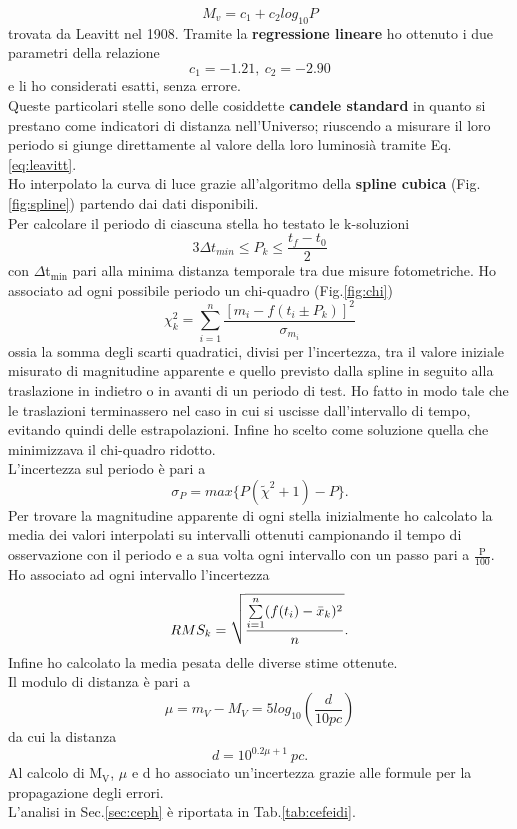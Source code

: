 \documentclass{article}
\numberwithin{equation}{subsection}
\begin{document}
\begin{equation} \label{eq:leavitt}
    M_v=c_1+c_2log_{10}P    
\end{equation}
trovata da Leavitt nel 1908. Tramite la \textbf{regressione lineare} ho ottenuto i due parametri della relazione
$$c_1=-1.21, \ c_2=-2.90$$
e li ho considerati esatti, senza errore.\\
Queste particolari stelle sono delle cosiddette \textbf{candele standard} in quanto si prestano come indicatori di distanza nell'Universo; riuscendo a misurare il loro periodo si giunge direttamente al valore della loro luminosià tramite Eq.\ref{eq:leavitt}.\\
Ho interpolato la curva di luce grazie all'algoritmo della \textbf{spline cubica} (Fig.\ref{fig:spline}) partendo dai dati disponibili. \\
Per calcolare il periodo di ciascuna stella ho testato le k-soluzioni
$$3\Delta t_{min} \le P_k \le \frac {t_f-t_0}{2}$$
con $\Delta$t$_{\mathrm{min}}$ pari alla minima distanza temporale tra due misure fotometriche. Ho associato ad ogni possibile periodo un chi-quadro (Fig.\ref{fig:chi})
\begin{equation} \label{eq:chi}
    \chi_k^2=\sum\limits_{i=1}^n\frac{[m_i-f(t_i\pm P_k)]^2}{\sigma_{m_i}}
\end{equation}ossia la somma degli scarti quadratici, divisi per l'incertezza, tra il valore iniziale misurato di magnitudine apparente e quello previsto dalla spline in seguito alla traslazione in indietro o in avanti di un periodo di test. Ho fatto in modo tale che le traslazioni terminassero nel caso in cui si uscisse dall'intervallo di tempo, evitando quindi delle estrapolazioni. Infine ho scelto come soluzione quella che minimizzava il chi-quadro ridotto.\\
L'incertezza sul periodo è pari a 
\begin{equation} \label{eq:per_err}
    \sigma_P=max\{P(\tilde{\chi}^2+1)-P\}.
\end{equation}
Per trovare la magnitudine apparente di ogni stella inizialmente ho calcolato la media dei valori interpolati su intervalli ottenuti campionando il tempo di osservazione con il periodo e a sua volta ogni intervallo con un passo pari a $\frac{\mathrm{P}}{\mathrm{100}}$. Ho associato ad ogni intervallo l'incertezza
\begin{equation}
    RMS_k=\sqrt\frac{\sum\limits_{i=1}^{n}(f(t_i)-\Bar{x}_k)^2}{n}.
\end{equation}
Infine ho calcolato la media pesata delle diverse stime ottenute.\\
Il modulo di distanza è pari a 
\begin{equation} \label{eq:modulo}
    \mu=m_V-M_V=5log_{10}(\frac{d}{10pc})
\end{equation}
da cui la distanza
\begin{equation} \label{eq:distanza}
    d=10^{0.2\mu+1} \ pc.
\end{equation}
Al calcolo di M$_\mathrm{V}$, $\mu$ e d ho associato un'incertezza grazie alle formule per la propagazione degli errori.\\
L'analisi in Sec.\ref{sec:ceph} è riportata in Tab.\ref{tab:cefeidi}.
\end{document}
